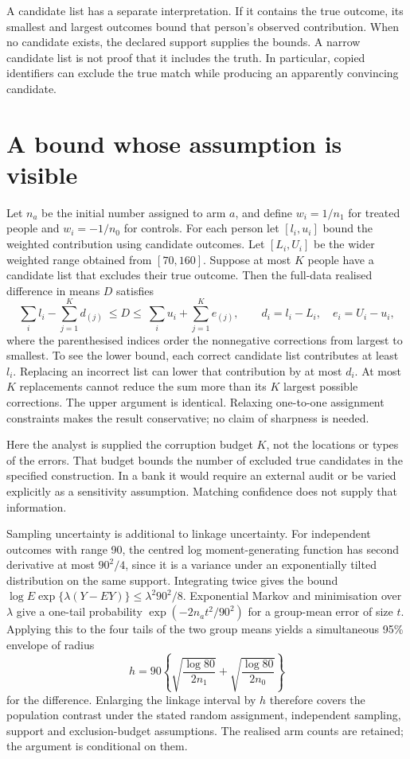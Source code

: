 A candidate list has a separate interpretation. If it contains the true
outcome, its smallest and largest outcomes bound that person's observed
contribution. When no candidate exists, the declared support supplies the
bounds. A narrow candidate list is not proof that it includes the truth.
In particular, copied identifiers can exclude the true match while producing
an apparently convincing candidate.

\section{A bound whose assumption is visible}
Let $n_a$ be the initial number assigned to arm $a$, and define
$w_i=1/n_1$ for treated people and $w_i=-1/n_0$ for controls.
For each person let $[l_i,u_i]$ bound the weighted contribution using candidate
outcomes. Let $[L_i,U_i]$ be the wider weighted range obtained from $[70,160]$.
Suppose at most $K$ people have a candidate list that excludes their true
outcome. Then the full-data realised difference in means $D$ satisfies
\[
 \sum_i l_i-\sum_{j=1}^{K} d_{(j)}
 \ \le D\le\
 \sum_i u_i+\sum_{j=1}^{K} e_{(j)},\qquad
 d_i=l_i-L_i,\quad e_i=U_i-u_i,
\]
where the parenthesised indices order the nonnegative corrections from
largest to smallest. To see the lower bound, each correct candidate list
contributes at least $l_i$. Replacing an incorrect list can lower that
contribution by at most $d_i$. At most $K$ replacements cannot reduce the sum
more than its $K$ largest possible corrections. The upper argument is
identical. Relaxing one-to-one assignment constraints makes the result
conservative; no claim of sharpness is needed.

Here the analyst is supplied the corruption budget $K$, not the locations
or types of the errors. That budget bounds the number of excluded true
candidates in the specified construction. In a bank it would require an
external audit or be varied explicitly as a sensitivity assumption.
Matching confidence does not supply that information.

Sampling uncertainty is additional to linkage uncertainty. For independent
outcomes with range 90, the centred log moment-generating function has second
derivative at most $90^2/4$, since it is a variance under an exponentially
tilted distribution on the same support. Integrating twice gives the bound
$\log E\exp\{\lambda(Y-EY)\}\le\lambda^2 90^2/8$. Exponential Markov
and minimisation over $\lambda$ give a one-tail probability
$\exp(-2n_a t^2/90^2)$ for a group-mean error of size $t$.
Applying this to the four tails of the two group means yields a simultaneous
95\% envelope of radius
\[
 h=90\left\{\sqrt{\frac{\log 80}{2n_1}}+
             \sqrt{\frac{\log 80}{2n_0}}\right\}
\]
for the difference. Enlarging the linkage interval by $h$ therefore
covers the population contrast under the stated random assignment,
independent sampling, support and exclusion-budget assumptions.
The realised arm counts are retained; the argument is conditional on them.

